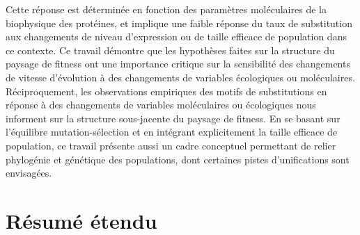 Cette réponse est déterminée en fonction des paramètres moléculaires de la biophysique des protéines, et implique une faible réponse du taux de substitution aux changements de niveau d'expression ou de taille efficace de population dans ce contexte.
Ce travail démontre que les hypothèses faites sur la structure du paysage de fitness ont une importance critique sur la sensibilité des changements de vitesse d'évolution à des changements de variables écologiques ou moléculaires.
Réciproquement, les observations empiriques des motifs de substitutions en réponse à des changements de variables moléculaires ou écologiques nous informent sur la structure sous-jacente du paysage de fitness.
En se basant sur l'équilibre mutation-sélection et en intégrant explicitement la taille efficace de population, ce travail présente aussi un cadre conceptuel permettant de relier phylogénie et génétique des populations, dont certaines pistes d'unifications sont envisagées.

\newpage
\section*{Résumé étendu}

